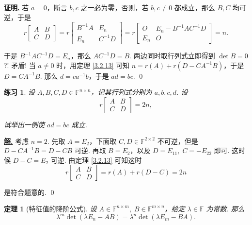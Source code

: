 \documentclass[10pt,openany]{article}
\theoremstyle{thmstyle} %
\newtheorem{theorem}{定理}[subsection]
\newtheorem{practice}{练习}[section]
\theoremstyle{defstyle} %
\theoremstyle{prostyle} %
\theoremstyle{exastyle}
\theoremstyle{remstyle}
\renewenvironment{proof}[1][证明]{\par\underline{\textbf{#1.}} \;\fangsong}{\qed\par}
\newenvironment{solution}{\par\underline{\textbf{解.}} \;\fangsong}{\qed\par}
\newcommand{\F}{\mathbb{F}}
\newcommand{\n}{^{n \times n}}
\newcommand{\mn}{^{m \times n}}
\newcommand{\nm}{^{n \times m}}
\begin{document}
\begin{proof}
	若 \( a=0 \)，断言 \( b,c \) 之一必为零，否则，若 \( b,c \neq 0 \) 都成立，那么 \( B,C \) 均可逆，于是
	\[ r\begin{bmatrix}
		A & B \\ C & D
	\end{bmatrix}=r\begin{bmatrix}
	B^{-1}A & E_n \\ E_n & C^{-1}D
	\end{bmatrix}=r\begin{bmatrix}
	O & E_n-B^{-1}AC^{-1}D \\ E_n & O
	\end{bmatrix}=n. \]
	
	于是 \( B^{-1}AC^{-1}D=E_n \)，那么 \( AC^{-1}D=B \). 两边同时取行列式立即得到 \( \det B=0 \)?! 矛盾! 当 \( a \neq 0 \) 时，用定理 \ref{3.2.13} 可知 \( n=r(A)+r(D-CA^{-1}B) \)，于是 \( D=CA^{-1}B \). 那么 \( d=ca^{-1}b \)，于是 \( ad=bc \).
\end{proof}

\begin{practice}
	设 \( A,B,C,D \in \F\n \)，记其行列式分别为 \( a,b,c,d \). 设
	\[ r\begin{bmatrix}
		A & B \\ C & D
	\end{bmatrix}=2n, \]
	
	试举出一例使 \( ad = bc \) 成立. 
\end{practice}

\begin{solution}
	考虑 \( n=2 \). 先取 \( A=E_2 \)，下面取 \( C,D \in \F^{2 \times 2} \) 不可逆，但是 \( D-CA^{-1}B=D-CB \) 可逆. 再取 \( B=E_2 \)，以及 \( D=E_{11}, \; C=-E_{22} \) 即可. 这时候 \( D-C=E_2 \) 可逆. 由定理 \ref{3.2.13} 可知这时
	\[ r\begin{bmatrix}
		A & B \\ C & D
	\end{bmatrix}=r(A)+r(D-C)=2n \]
	
	是符合题意的.
\end{solution}

\begin{theorem}[特征值的降阶公式] \label{3.2.15}
	设 \( A \in \F\nm, \; B \in \F\mn \)，给定 \( \lambda \in \F \) 为常数. 那么
	\[ \lambda^{m} \det(\lambda E_n - AB)= \lambda^{n} \det(\lambda E_m - BA). \]
\end{theorem}
\end{document}
